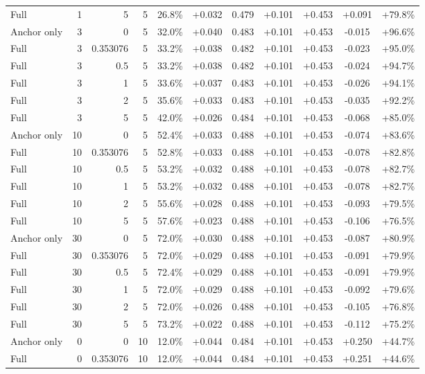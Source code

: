 \begin{table}[htbp]
\begin{tabular}{lrrrccccccc}
Full & 1 & 5 & 5 & 26.8\% & +0.032 & 0.479 & +0.101 & +0.453 & +0.091 & +79.8\% \\
Anchor only & 3 & 0 & 5 & 32.0\% & +0.040 & 0.483 & +0.101 & +0.453 & -0.015 & +96.6\% \\
Full & 3 & 0.353076 & 5 & 33.2\% & +0.038 & 0.482 & +0.101 & +0.453 & -0.023 & +95.0\% \\
Full & 3 & 0.5 & 5 & 33.2\% & +0.038 & 0.482 & +0.101 & +0.453 & -0.024 & +94.7\% \\
Full & 3 & 1 & 5 & 33.6\% & +0.037 & 0.483 & +0.101 & +0.453 & -0.026 & +94.1\% \\
Full & 3 & 2 & 5 & 35.6\% & +0.033 & 0.483 & +0.101 & +0.453 & -0.035 & +92.2\% \\
Full & 3 & 5 & 5 & 42.0\% & +0.026 & 0.484 & +0.101 & +0.453 & -0.068 & +85.0\% \\
Anchor only & 10 & 0 & 5 & 52.4\% & +0.033 & 0.488 & +0.101 & +0.453 & -0.074 & +83.6\% \\
Full & 10 & 0.353076 & 5 & 52.8\% & +0.033 & 0.488 & +0.101 & +0.453 & -0.078 & +82.8\% \\
Full & 10 & 0.5 & 5 & 53.2\% & +0.032 & 0.488 & +0.101 & +0.453 & -0.078 & +82.7\% \\
Full & 10 & 1 & 5 & 53.2\% & +0.032 & 0.488 & +0.101 & +0.453 & -0.078 & +82.7\% \\
Full & 10 & 2 & 5 & 55.6\% & +0.028 & 0.488 & +0.101 & +0.453 & -0.093 & +79.5\% \\
Full & 10 & 5 & 5 & 57.6\% & +0.023 & 0.488 & +0.101 & +0.453 & -0.106 & +76.5\% \\
Anchor only & 30 & 0 & 5 & 72.0\% & +0.030 & 0.488 & +0.101 & +0.453 & -0.087 & +80.9\% \\
Full & 30 & 0.353076 & 5 & 72.0\% & +0.029 & 0.488 & +0.101 & +0.453 & -0.091 & +79.9\% \\
Full & 30 & 0.5 & 5 & 72.4\% & +0.029 & 0.488 & +0.101 & +0.453 & -0.091 & +79.9\% \\
Full & 30 & 1 & 5 & 72.0\% & +0.029 & 0.488 & +0.101 & +0.453 & -0.092 & +79.6\% \\
Full & 30 & 2 & 5 & 72.0\% & +0.026 & 0.488 & +0.101 & +0.453 & -0.105 & +76.8\% \\
Full & 30 & 5 & 5 & 73.2\% & +0.022 & 0.488 & +0.101 & +0.453 & -0.112 & +75.2\% \\
Anchor only & 0 & 0 & 10 & 12.0\% & +0.044 & 0.484 & +0.101 & +0.453 & +0.250 & +44.7\% \\
Full & 0 & 0.353076 & 10 & 12.0\% & +0.044 & 0.484 & +0.101 & +0.453 & +0.251 & +44.6\% \\

\end{tabular}
\end{table}
